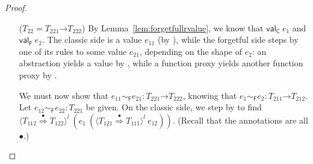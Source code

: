 \documentclass[9pt]{extarticle}
\newcommand{\ottnt}[1]{\mathit{#1}}
\newcommand{\ottsym}[1]{#1}
\begin{document}
{\begin{lemma}
\begin{proof}
{\begin{itemize}
      If $ \ottnt{e_{{\mathrm{12}}}}  [  \ottnt{k} / \mathit{x}  ]  \,  \longrightarrow ^{*}_{  \mathsf{C}  }  \,  \mathord{\Uparrow}  \ottnt{l'} $, then the entire classic side
      steps to $ \mathord{\Uparrow}  \ottnt{l'} $ by  and ,
      and then we are done. If not, then both predicates reduce to a
      boolean together. If they reduce to $ \mathsf{false} $, then the
      classic side eventually reduces to $ \mathord{\Uparrow}  \ottnt{l} $ via
       and , and we are done. If they both
      go to $ \mathsf{true} $, then both sides step by  and
       to yield $\ottnt{k}$, and we can find $ \ottnt{k}   \sim _{  \mathsf{F}  }  \ottnt{k}  :   \{ \mathit{x} \mathord{:} \ottnt{B} \mathrel{\mid} \ottnt{e_{{\mathrm{22}}}} \}  $ easily---we have a derivation for $ \ottnt{e_{{\mathrm{22}}}}  [  \ottnt{k} / \mathit{x}  ]  \,  \longrightarrow ^{*}_{  \mathsf{F}  }  \,  \mathsf{true} $ handy.

    \item[($\ottnt{T_{{\mathrm{22}}}}  \ottsym{=}   \ottnt{T_{{\mathrm{221}}}} \mathord{ \rightarrow } \ottnt{T_{{\mathrm{222}}}} $)] By
      Lemma~\ref{lem:forgetfullrvalue}, we know that $ \mathsf{val} _{  \mathsf{C}  }~ \ottnt{e_{{\mathrm{1}}}} $
      and $ \mathsf{val} _{  \mathsf{F}  }~ \ottnt{e_{{\mathrm{2}}}} $. The classic side is a value $\ottnt{e_{{\mathrm{11}}}}$ (by
      ), while the forgetful side steps by one of its
       rules to some value $\ottnt{e_{{\mathrm{21}}}}$, depending on the
      shape of $\ottnt{e_{{\mathrm{2}}}}$: an abstraction yields a value by ,
      while a function proxy yields another function proxy by
      .

      We must now show that $ \ottnt{e_{{\mathrm{11}}}}   \sim _{  \mathsf{F}  }  \ottnt{e_{{\mathrm{21}}}}  :   \ottnt{T_{{\mathrm{221}}}} \mathord{ \rightarrow } \ottnt{T_{{\mathrm{222}}}}  $, knowing
      that $ \ottnt{e_{{\mathrm{1}}}}   \sim _{  \mathsf{F}  }  \ottnt{e_{{\mathrm{2}}}}  :   \ottnt{T_{{\mathrm{211}}}} \mathord{ \rightarrow } \ottnt{T_{{\mathrm{212}}}}  $. Let $ \ottnt{e_{{\mathrm{12}}}}   \sim _{  \mathsf{F}  }  \ottnt{e_{{\mathrm{22}}}}  :  \ottnt{T_{{\mathrm{221}}}} $ be
      given. On the classic side, we step by  to find
      $ \langle  \ottnt{T_{{\mathrm{112}}}}  \mathord{ \overset{\bullet}{\Rightarrow} }  \ottnt{T_{{\mathrm{122}}}}  \rangle^{ \ottnt{l} } ~   (  \ottnt{e_{{\mathrm{1}}}} ~  (  \langle  \ottnt{T_{{\mathrm{121}}}}  \mathord{ \overset{\bullet}{\Rightarrow} }  \ottnt{T_{{\mathrm{111}}}}  \rangle^{ \ottnt{l} } ~  \ottnt{e_{{\mathrm{12}}}}  )   )  $. (Recall that the
      annotations are all $ \bullet $.)


\end{itemize}}
\end{proof}
\end{lemma}}
\end{document}
